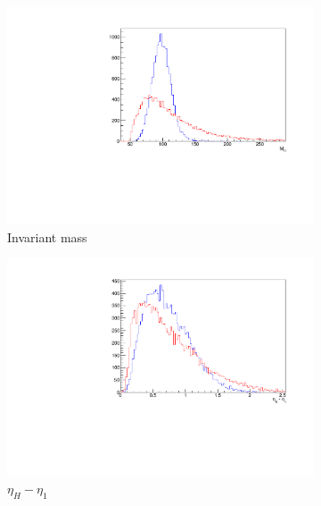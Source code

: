\begin{figure}[htbp]
	\centering	
	\begin{subfigure}[b]{0.3\textwidth}
	                \includegraphics[width=\textwidth]{img/mh}
	                \caption{Invariant mass}
	                \label{fig:mh}
	\end{subfigure}
	\begin{subfigure}[b]{0.3\textwidth}
	                \includegraphics[width=\textwidth]{img/angle}
	                \caption{$\eta_H - \eta_1$}
	                \label{fig:angle}
	\end{subfigure}
	\begin{subfigure}[b]{0.3\textwidth}

\end{subfigure}
\end{figure}
